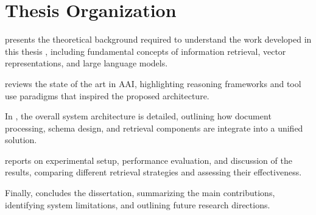 \section{Thesis Organization}

 presents the theoretical background required to understand the work developed in this thesis , including fundamental concepts of information retrieval, vector representations, and large language models. 

 reviews the state of the art in \gls{AAI}, highlighting reasoning frameworks and tool use paradigms that inspired the proposed architecture. 


In , the overall system architecture is detailed, outlining how document processing, schema design, and retrieval components are integrate into a unified solution.

 reports on experimental setup, performance evaluation, and discussion of the results, comparing different retrieval strategies and assessing their effectiveness. 

Finally,  concludes the dissertation, summarizing the main contributions, identifying system limitations, and outlining future research directions.
